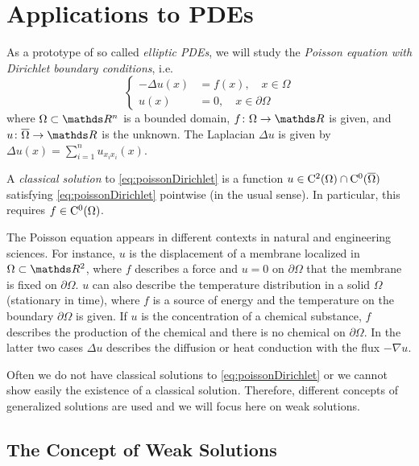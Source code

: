 \chapter{Applications to PDEs}
\label{chap:appsToPDEs}

As a prototype of so called \emph{elliptic PDEs}, we will study the \emph{Poisson equation with Dirichlet boundary conditions}, i.e.
\begin{equation}
  \label{eq:poissonDirichlet}
  \begin{cases}
    -\Delta u(x) &= f(x), \quad x \in \Omega \\
    u(x) &= 0, \quad x \in \partial\Omega
  \end{cases}
\end{equation}
where $\Omega \subset \R^n$ is a bounded domain, $f \colon \Omega \to \R$ is given, and $u \colon \overline \Omega \to \R$ is the unknown.
The Laplacian $\Delta u$ is given by $\Delta u(x) = \sum_{i = 1}^n u_{x_i x_i}(x)$.

\begin{defn}
  A \emph{classical solution} to \eqref{eq:poissonDirichlet} is a function $u \in \mathrm{C}^2(\Omega) \cap \mathrm{C}^0(\overline\Omega)$ satisfying \eqref{eq:poissonDirichlet} pointwise (in the usual sense).
  In particular, this requires $f \in \mathrm{C}^0(\Omega)$.
\end{defn}

  The Poisson equation appears in different contexts in natural and engineering sciences.
  For instance, $u$ is the displacement of a membrane localized in $\Omega \subset \R^2$, where $f$ describes a force and $u = 0$ on $\partial\Omega$ that the membrane is fixed on $\partial\Omega$.
  $u$ can also describe the temperature distribution in a solid $\Omega$ (stationary in time), where $f$ is a source of energy and the temperature on the boundary $\partial\Omega$ is given.
  If $u$ is the concentration of a chemical substance, $f$ describes the production of the chemical and there is no chemical on $\partial\Omega$.
  In the latter two cases $\Delta u$ describes the diffusion or heat conduction with the flux $-\nabla u$.

  Often we do not have classical solutions to \eqref{eq:poissonDirichlet} or we cannot show easily the existence of a classical solution.
  Therefore, different concepts of generalized solutions are used and we will focus here on weak solutions.

\section{The Concept of Weak Solutions}

